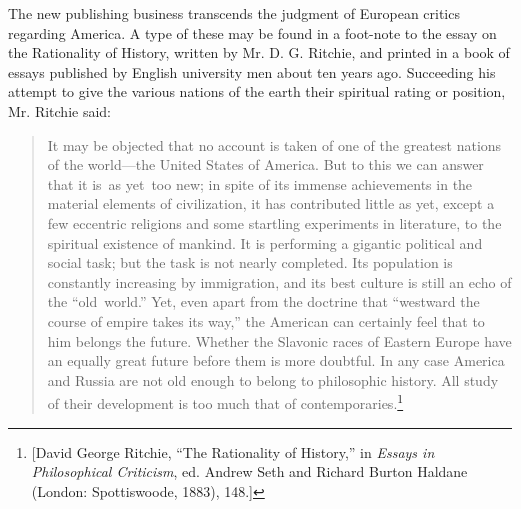 \documentclass[twoside,symmetric,nobib,justified]{tufte-book}
\begin{document}
The new publishing business transcends the judgment of European critics
regarding America. A type of these may be found in a foot-note to the
essay on the Rationality of History, written by Mr. D. G. Ritchie, and
printed in a book of essays published by English university men about
ten years ago. Succeeding his attempt to give the various nations of the
earth their spiritual rating or position, Mr. Ritchie said:

\begin{quote}
It may be objected that no account is taken of one of the greatest
nations of the world---the United States of America. But to this we can
answer that it is~as yet~too new; in spite of its immense achievements
in the material elements of civilization, it has contributed little as
yet, except a few eccentric religions and some startling experiments in
literature, to the spiritual existence of mankind. It is performing a
gigantic political and social task; but the task is not nearly
completed. Its population is constantly increasing by immigration, and
its best culture is still an echo of the ``old~world.'' Yet, even apart
from the doctrine that ``westward the course of empire takes its way,''
the American can certainly feel that to him belongs the future. Whether
the Slavonic races of Eastern Europe have an equally great future before
them is more doubtful. In any case America and Russia are not old enough
to belong to philosophic history. All study of their development is too
much that of contemporaries.\footnote{{[}David George Ritchie, ``The
  Rationality of History,'' in \emph{Essays in Philosophical Criticism},
  ed. Andrew Seth and Richard Burton Haldane (London: Spottiswoode,
  1883), 148.{]}}~
\end{quote}
\end{document}
